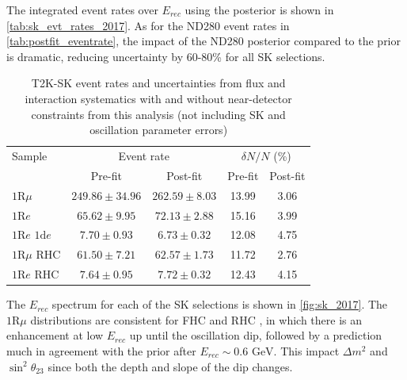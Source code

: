 The integrated event rates over $E_{rec}$ using the posterior is shown in \autoref{tab:sk_evt_rates_2017}. As for the ND280 event rates in \autoref{tab:postfit_eventrate}, the impact of the ND280 posterior compared to the prior is dramatic, reducing uncertainty by 60-80\% for all SK selections.
\begin{table}[h]
	\begin{tabular}{l | c c | c c}
		\hline
		\hline
		Sample & \multicolumn{2}{c|}{Event rate} & \multicolumn{2}{c}{$\delta N/N$ (\%)} \\
		& Pre-fit & Post-fit & Pre-fit & Post-fit \\
		\hline
		$1\text{R}\mu$ & $249.86\pm34.96$ & $262.59\pm8.03$ & 13.99 & 3.06 \\
		$1\text{R}e$ & $65.62\pm9.95$ & $72.13\pm2.88$ & 15.16 &  3.99   \\
		$1\text{R}e \text{ 1d}e$ & $7.70\pm0.93$ & $6.73\pm0.32$ & 12.08 & 4.75  \\
		
		$1\text{R}\mu \text{ RHC}$ & $61.50\pm7.21$ & $62.57\pm1.73$ & 11.72 & 2.76 \\
		$1\text{R}e \text{ RHC}$ & $7.64\pm0.95$ & $7.72\pm0.32$ & 12.43 & 4.15  \\
		\hline
		\hline
	\end{tabular}
\caption{T2K-SK event rates and uncertainties from flux and interaction systematics with and without near-detector constraints from this analysis (not including SK and oscillation parameter errors)}
\label{tab:sk_evt_rates_2017}
\end{table}

The $E_{rec}$ spectrum for each of the SK selections is shown in \autoref{fig:sk_2017}. The $1\text{R}\mu$ distributions are consistent for FHC and RHC , in which there is an enhancement at low $E_{rec}$ up until the oscillation dip, followed by a prediction much in agreement with the prior after $E_{rec}\sim0.6\text{ GeV}$. This impact $\Delta m^2$ and $\sin^2\theta_{23}$ since both the depth and slope of the dip changes. 

